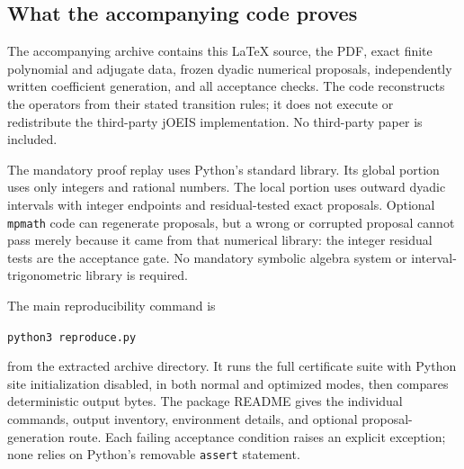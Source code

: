 \documentclass[11pt]{article}
\theoremstyle{definition}\newtheorem{definition}[theorem]{Definition}
\theoremstyle{remark}\newtheorem{remark}[theorem]{Remark}
\begin{document}
\subsection{What the accompanying code proves}
The accompanying archive contains this \LaTeX{} source, the PDF, exact finite polynomial and adjugate data, frozen dyadic numerical proposals, independently written coefficient generation, and all acceptance checks. The code reconstructs the operators from their stated transition rules; it does not execute or redistribute the third-party jOEIS implementation. No third-party paper is included.

The mandatory proof replay uses Python's standard library. Its global portion uses only integers and rational numbers. The local portion uses outward dyadic intervals with integer endpoints and residual-tested exact proposals. Optional \texttt{mpmath} code can regenerate proposals, but a wrong or corrupted proposal cannot pass merely because it came from that numerical library: the integer residual tests are the acceptance gate. No mandatory symbolic algebra system or interval-trigonometric library is required.

The main reproducibility command is
\begin{center}\texttt{python3 reproduce.py}\end{center}
from the extracted archive directory. It runs the full certificate suite with Python site initialization disabled, in both normal and optimized modes, then compares deterministic output bytes. The package README gives the individual commands, output inventory, environment details, and optional proposal-generation route. Each failing acceptance condition raises an explicit exception; none relies on Python's removable \texttt{assert} statement.
\end{document}
